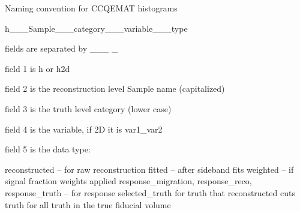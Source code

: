 Naming convention for CCQEMAT histograms

h\+\_\+\+\_\+\+\_\+\+Sample\+\_\+\+\_\+\+\_\+category\+\_\+\+\_\+\+\_\+variable\+\_\+\+\_\+\+\_\+type

fields are separated by \+\_\+\+\_\+\+\_ \+\_\+

field 1 is h or h2d

field 2 is the reconstruction level Sample name (capitalized)

field 3 is the truth level category (lower case)

field 4 is the variable, if 2D it is var1\+\_\+var2

field 5 is the data type\+:

reconstructed – for raw reconstruction fitted – after sideband fits weighted – if signal fraction weights applied response\+\_\+migration, response\+\_\+reco, response\+\_\+truth – for response selected\+\_\+truth for truth that reconstructed cuts truth for all truth in the true fiducial volume 
